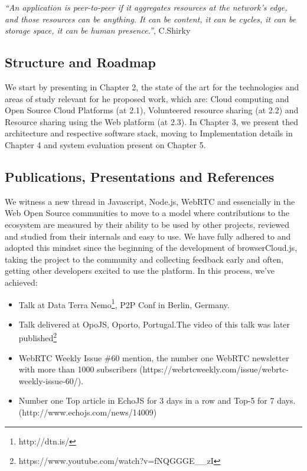   \textit{``An application is peer-to-peer if it aggregates resources at the network’s edge, and those resources can be anything. It can be content, it can be cycles, it can be storage space, it can be human presence.''}, C.Shirky \cite{Shirky.}

\subsection{Structure and Roadmap}

We start by presenting in Chapter 2, the state of the art for the technologies and areas of study relevant for he proposed work, which are: Cloud computing and Open Source Cloud Platforms (at 2.1), Volunteered resource sharing (at 2.2) and Resource sharing using the Web platform (at 2.3). In Chapter 3, we present thed architecture and respective software stack, moving to Implementation details in Chapter 4 and system evaluation present on Chapter 5.

\subsection{Publications, Presentations and References}

We witness a new thread in Javascript, Node.js, WebRTC and essencially in the Web Open Source communities to move to a model where contributions to the ecosystem are measured by their ability to be used by other projects, reviewed and studied from their internals and easy to use. We have fully adhered to and adopted this mindset since the beginning of the development of browserCloud.js, taking the project to the community and collecting feedback early and often, getting other developers excited to use the platform. In this process, we've achieved:

\begin{itemize}
  \item Talk at Data Terra Nemo\footnote{http://dtn.is/}, P2P Conf in Berlin, Germany. 
    \item Talk delivered at OpoJS, Oporto, Portugal.The video of this talk was later published\footnote{https://www.youtube.com/watch?v=fNQGGGE\_\_zI}
    \item WebRTC Weekly Issue \#60 mention, the number one WebRTC newsletter with more than 1000 subscribers (https://webrtcweekly.com/issue/webrtc-weekly-issue-60/).
    \item Number one Top article in EchoJS for 3 days in a row and Top-5 for 7 days. (http://www.echojs.com/news/14009)
\end{itemize}
